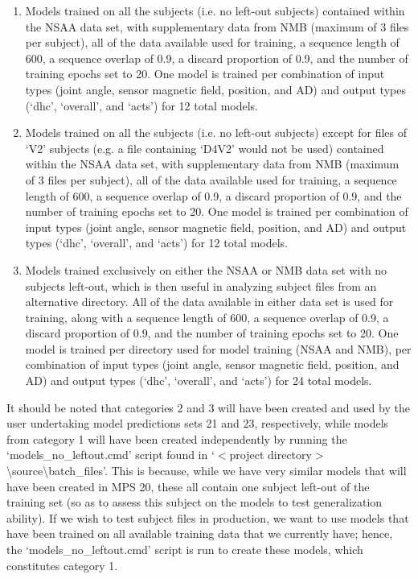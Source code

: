 \documentclass[12pt,twoside]{report}
\begin{document}
\begin{enumerate}
	\item Models trained on all the subjects (i.e. no left-out subjects) contained within the NSAA data set, with supplementary data from NMB (maximum of 3 files per subject), all of the data available used for training, a sequence length of 600, a sequence overlap of 0.9, a discard proportion of 0.9, and the number of training epochs set to 20. One model is trained per combination of input types (joint angle, sensor magnetic field, position, and AD) and output types (‘dhc’, ‘overall’, and ‘acts’) for 12 total models.
	\item Models trained on all the subjects (i.e. no left-out subjects) except for files of ‘V2’ subjects (e.g. a file containing ‘D4V2’ would not be used) contained within the NSAA data set, with supplementary data from NMB (maximum of 3 files per subject), all of the data available used for training, a sequence length of 600, a sequence overlap of 0.9, a discard proportion of 0.9, and the number of training epochs set to 20. One model is trained per combination of input types (joint angle, sensor magnetic field, position, and AD) and output types (‘dhc’, ‘overall’, and ‘acts’) for 12 total models.
	\item Models trained exclusively on either the NSAA or NMB data set with no subjects left-out, which is then useful in analyzing subject files from an alternative directory. All of the data available in either data set is used for training, along with a sequence length of 600, a sequence overlap of 0.9, a discard proportion of 0.9, and the number of training epochs set to 20. One model is trained per directory used for model training (NSAA and NMB), per combination of input types (joint angle, sensor magnetic field, position, and AD) and output types (‘dhc’, ‘overall’, and ‘acts’) for 24 total models.
\end{enumerate}

\quad It should be noted that categories 2 and 3 will have been created and used by the user undertaking model predictions sets 21 and 23, respectively, while models from category 1 will have been created independently by running the ‘models\_no\_leftout.cmd’ script found in ‘$<$project directory$>$\textbackslash source\textbackslash batch\_files’. This is because, while we have very similar models that will have been created in MPS 20, these all contain one subject left-out of the training set (so as to assess this subject on the models to test generalization ability). If we wish to test subject files in production, we want to use models that have been trained on all available training data that we currently have; hence, the ‘models\_no\_leftout.cmd’ script is run to create these models, which constitutes category 1.
\end{document}
